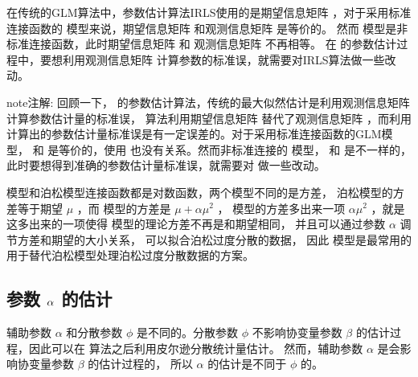 \documentclass[letterpaper,10pt,english]{sphinxmanual}
\begin{document}
在传统的GLM算法中，参数估计算法IRLS使用的是期望信息矩阵 
，对于采用标准连接函数的  模型来说，期望信息矩阵 
和观测信息矩阵  是等价的。
然而  模型是非标准连接函数，此时期望信息矩阵  和
观测信息矩阵  不再相等。
在  的参数估计过程中，要想利用观测信息矩阵 
计算参数的标准误，就需要对IRLS算法做一些改动。

\begin{sphinxadmonition}{note}{注解:}
回顾一下， 的参数估计算法，传统的最大似然估计是利用观测信息矩阵  计算参数估计量的标准误，
 算法利用期望信息矩阵  替代了观测信息矩阵  ，而利用 
计算出的参数估计量标准误是有一定误差的。对于采用标准连接函数的GLM模型， 和 
是等价的，使用  也没有关系。然而非标准连接的  模型， 和  是不一样的，
此时要想得到准确的参数估计量标准误，就需要对  做一些改动。
\end{sphinxadmonition}

 模型和泊松模型连接函数都是对数函数，两个模型不同的是方差，
泊松模型的方差等于期望 \(\mu\)
，而  模型的方差是 \(\mu+\alpha \mu^2\)
， 模型的方差多出来一项 \(\alpha \mu^2\)
，就是这多出来的一项使得  模型的理论方差不再是和期望相同，
并且可以通过参数 \(\alpha\) 调节方差和期望的大小关系，
可以拟合泊松过度分散的数据，
因此  模型是最常用的用于替代泊松模型处理泊松过度分散数据的方案。


\subsection{参数 \protect\(\alpha\protect\) 的估计}
\label{\detokenize{_u8d1f_u4e8c_u9879_u6a21_u578b/content:id10}}
辅助参数 \(\alpha\) 和分散参数 \(\phi\)
是不同的。分散参数 \(\phi\) 不影响协变量参数 \(\beta\)
的估计过程，因此可以在  算法之后利用皮尔逊分散统计量估计。
然而，辅助参数 \(\alpha\) 是会影响协变量参数 \(\beta\) 的估计过程的，
所以 \(\alpha\) 的估计是不同于 \(\phi\) 的。
\end{document}
